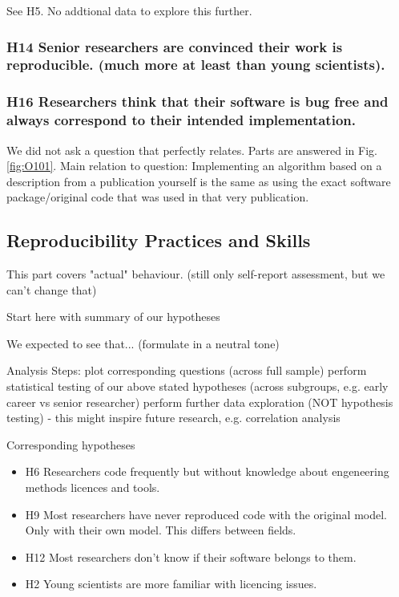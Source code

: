 \documentclass{article}
\begin{document}
See H5. No addtional data to explore this further.

\subsubsection{H14 Senior researchers are convinced their work is reproducible. (much more at least than young scientists).}



\subsubsection{H16 Researchers think that their software is bug free and always correspond to their intended implementation.}
We did not ask a question that perfectly relates. Parts are answered in Fig. \ref{fig:O101}.
Main relation to question: Implementing an algorithm based on a description from a publication yourself is the same as using the exact software package/original code that was used in that very publication.



\newpage

\subsection{Reproducibility Practices and Skills}
This part covers "actual" behaviour. (still only self-report assessment, but we can't change that)

    Start here with summary of our hypotheses

We expected to see that... (formulate in a neutral tone)

    Analysis Steps:
        plot corresponding questions (across full sample)
        perform statistical testing of our above stated hypotheses (across subgroups, e.g. early career vs senior researcher)
        perform further data exploration (NOT hypothesis testing) - this might inspire future research, e.g. correlation analysis


Corresponding hypotheses
\begin{itemize}
	\item H6 Researchers code frequently but without knowledge about engeneering methods licences and tools.
	\item H9 Most researchers have never reproduced code with the original model. Only with their own model. This differs between fields.
	\item H12 Most researchers don't know if their software belongs to them.
	\item H2 Young scientists are more familiar with licencing issues.
\end{itemize}
\end{document}
